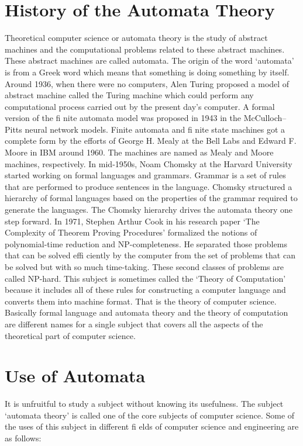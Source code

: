 \documentclass[]{article}
\begin{document}
\section{History of the Automata Theory}
Theoretical computer science or automata theory is the study of abstract machines and the computational problems related to these abstract machines. These abstract machines are called automata. The
origin of the word ‘automata’ is from a Greek word which means that something is doing
something by itself.
Around 1936, when there were no computers, Alen Turing proposed a model of abstract machine
called the Turing machine which could perform any computational process carried out by the present
day’s computer. A formal version of the fi nite automata model was proposed in 1943 in the McCulloch–
Pitts neural network models. Finite automata and fi nite state machines got a complete form by the
efforts of George H. Mealy at the Bell Labs and Edward F. Moore in IBM around 1960. The machines
are named as Mealy and Moore machines, respectively. In mid-1950s, Noam Chomsky at the Harvard
University started working on formal languages and grammars. Grammar is a set of rules that are
performed to produce sentences in the language. Chomsky structured a hierarchy of formal languages
based on the properties of the grammar required to generate the languages. The Chomsky hierarchy
drives the automata theory one step forward. In 1971, Stephen Arthur Cook in his research paper ‘The
Complexity of Theorem Proving Procedures’ formalized the notions of polynomial-time reduction and
NP-completeness. He separated those problems that can be solved effi ciently by the computer from
the set of problems that can be solved but with so much time-taking. These second classes of problems
are called NP-hard.
This subject is sometimes called the ‘Theory of Computation’ because it includes all of these rules
for constructing a computer language and converts them into machine format. That is the theory of
computer science. Basically formal language and automata theory and the theory of computation are
different names for a single subject that covers all the aspects of the theoretical part of computer science.
\section{Use of Automata}
It is unfruitful to study a subject without knowing its usefulness. The subject ‘automata theory’ is called
one of the core subjects of computer science. Some of the uses of this subject in different fi elds of
 computer science and engineering are as follows:
 
\end{document}
